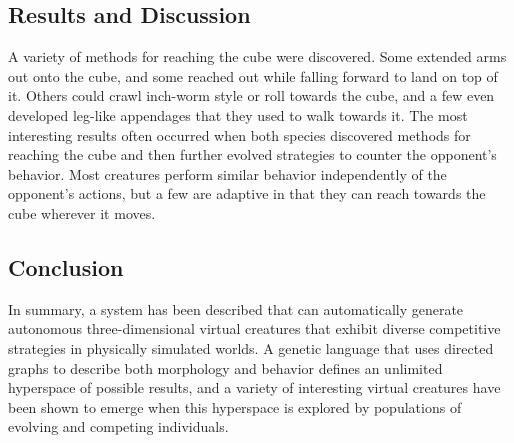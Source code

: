 \documentclass[../main.tex]{subfiles}
\begin{document}
\subsection{Results and Discussion}

A variety of methods for reaching the cube were discovered. Some extended arms out onto the cube, and some reached out
while falling forward to land on top of it. Others could crawl inch-worm style or roll towards the cube, and a few even
developed leg-like appendages that they used to walk towards it. The most interesting results often occurred when both
species discovered methods for reaching the cube and then further evolved strategies to counter the opponent's
behavior. Most creatures perform similar behavior independently of the opponent's actions, but a few are adaptive in
that they can reach towards the cube wherever it moves.

\subsection{Conclusion}

In summary, a system has been described that can automatically generate autonomous three-dimensional virtual creatures
that exhibit diverse competitive strategies in physically simulated worlds. A genetic language that uses directed
graphs to describe both morphology and behavior defines an unlimited hyperspace of possible results, and a variety of
interesting virtual creatures have been shown to emerge when this hyperspace is explored by populations of evolving and
competing individuals.
\end{document}
